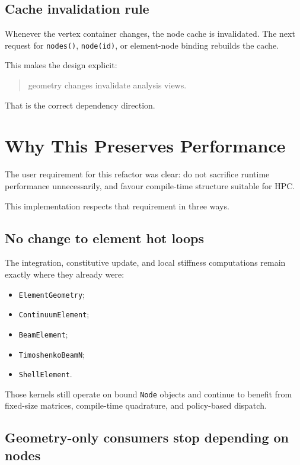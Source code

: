 \subsection{Cache invalidation rule}

Whenever the vertex container changes, the node cache is invalidated.  The next
request for \texttt{nodes()}, \texttt{node(id)}, or element-node binding
rebuilds the cache.

This makes the design explicit:

\begin{quote}
geometry changes invalidate analysis views.
\end{quote}

That is the correct dependency direction.


\section{Why This Preserves Performance}
\label{sec:domain-vertex-transition-performance}

The user requirement for this refactor was clear: do not sacrifice runtime
performance unnecessarily, and favour compile-time structure suitable for HPC.

This implementation respects that requirement in three ways.

\subsection{No change to element hot loops}

The integration, constitutive update, and local stiffness computations remain
exactly where they already were:

\begin{itemize}[nosep]
  \item \texttt{ElementGeometry};
  \item \texttt{ContinuumElement};
  \item \texttt{BeamElement};
  \item \texttt{TimoshenkoBeamN};
  \item \texttt{ShellElement}.
\end{itemize}

Those kernels still operate on bound \texttt{Node} objects and continue to
benefit from fixed-size matrices, compile-time quadrature, and policy-based
dispatch.

\subsection{Geometry-only consumers stop depending on nodes}

